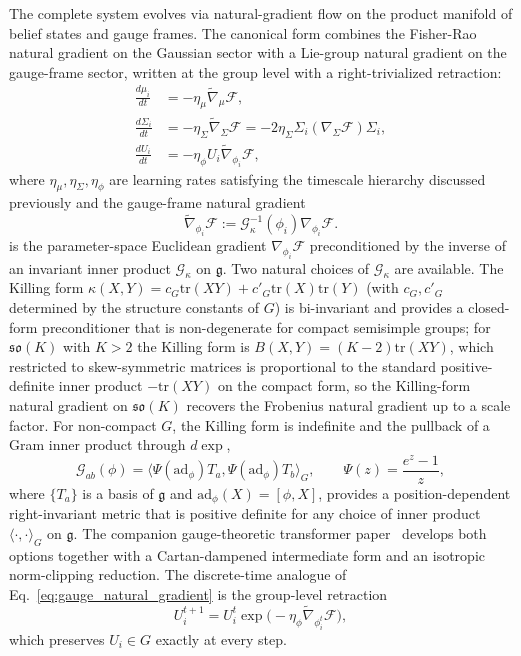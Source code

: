 \documentclass[11pt]{article}
\begin{document}
The complete system evolves via natural-gradient flow on the product manifold of belief states and gauge frames. The canonical form combines the Fisher-Rao natural gradient on the Gaussian sector with a Lie-group natural gradient on the gauge-frame sector, written at the group level with a right-trivialized retraction:
\begin{align}
\frac{d\mu_i}{dt} &= -\eta_\mu \tilde{\nabla}_\mu \mathcal{F}, \\
\frac{d\Sigma_i}{dt} &= -\eta_\Sigma \tilde{\nabla}_\Sigma \mathcal{F} = -2\eta_\Sigma \Sigma_i (\nabla_\Sigma \mathcal{F}) \Sigma_i, \\
\frac{dU_i}{dt} &= -\eta_\phi U_i \tilde{\nabla}_{\phi_i} \mathcal{F},
\label{eq:gauge_natural_gradient}
\end{align}
where $\eta_\mu, \eta_\Sigma, \eta_\phi$ are learning rates satisfying the timescale hierarchy discussed previously and the gauge-frame natural gradient
\begin{equation}
\tilde{\nabla}_{\phi_i} \mathcal{F} := \mathcal{G}_\kappa^{-1}(\phi_i) \nabla_{\phi_i} \mathcal{F}.
\label{eq:gauge_natural_gradient_def}
\end{equation}
is the parameter-space Euclidean gradient $\nabla_{\phi_i}\mathcal{F}$ preconditioned by the inverse of an invariant inner product $\mathcal{G}_\kappa$ on $\mathfrak{g}$. Two natural choices of $\mathcal{G}_\kappa$ are available. The Killing form $\kappa(X,Y) = c_G \mathrm{tr}(XY) + c'_G \mathrm{tr}(X)\mathrm{tr}(Y)$ (with $c_G, c'_G$ determined by the structure constants of $G$) is bi-invariant and provides a closed-form preconditioner that is non-degenerate for compact semisimple groups; for $\mathfrak{so}(K)$ with $K > 2$ the Killing form is $B(X,Y) = (K-2)\mathrm{tr}(XY)$, which restricted to skew-symmetric matrices is proportional to the standard positive-definite inner product $-\mathrm{tr}(XY)$ on the compact form, so the Killing-form natural gradient on $\mathfrak{so}(K)$ recovers the Frobenius natural gradient up to a scale factor. For non-compact $G$, the Killing form is indefinite and the pullback of a Gram inner product through $d\exp$,
\begin{equation}
\mathcal{G}_{ab}(\phi) = \langle \Psi(\mathrm{ad}_\phi)T_a, \Psi(\mathrm{ad}_\phi)T_b \rangle_G,
\qquad
\Psi(z) = \frac{e^z - 1}{z},
\label{eq:pullback_metric}
\end{equation}
where $\{T_a\}$ is a basis of $\mathfrak{g}$ and $\mathrm{ad}_\phi(X) = [\phi, X]$, provides a position-dependent right-invariant metric that is positive definite for any choice of inner product $\langle\cdot,\cdot\rangle_G$ on $\mathfrak{g}$. The companion gauge-theoretic transformer paper~\cite{Dennis2025trans} develops both options together with a Cartan-dampened intermediate form and an isotropic norm-clipping reduction. The discrete-time analogue of Eq.~\eqref{eq:gauge_natural_gradient} is the group-level retraction
\begin{equation}
U_i^{t+1} = U_i^t \exp\big(-\eta_\phi \tilde{\nabla}_{\phi_i^t} \mathcal{F}\big),
\label{eq:gauge_group_retraction}
\end{equation}
which preserves $U_i \in G$ exactly at every step.
\end{document}

